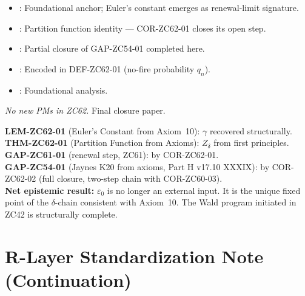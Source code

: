 \documentclass[12pt, a4paper]{article}
\begin{document}
\begin{inheritbox}[title={ZC62 Backward Inheritance}]
\begin{itemize}[leftmargin=1.5em]
\item {}: Foundational anchor; Euler's
  constant emerges as renewal-limit signature.
\item {}: Partition function
  identity --- COR-ZC62-01 closes its open step.
\item {}: Partial closure of
  GAP-ZC54-01 completed here.
\item {}: Encoded
  in DEF-ZC62-01 (no-fire probability $q_{n}$).
\item {}: Foundational analysis.
\end{itemize}
\end{inheritbox}

\begin{correctionbox}[title={ZC62 Forward Corrections / PMs}]
\textit{No new PMs in ZC62.} Final closure paper.
\end{correctionbox}

\begin{conmapbox}[title={ZC62 Closure Record --- Master Closures of v17.11}]
\textbf{LEM-ZC62-01} (Euler's Constant from Axiom~10):
\promotedstar{} $\gamma$ recovered structurally.\\[0.2em]
\textbf{THM-ZC62-01} (Partition Function from Axioms): \promotedstar{}
$Z_{\delta}$ from first principles.\\[0.2em]
\textbf{GAP-ZC61-01} (renewal step, ZC61): \closedcheck{} by
COR-ZC62-01.\\[0.2em]
\textbf{GAP-ZC54-01} (Jaynes K20 from axioms, Part H v17.10 XXXIX):
\closedcheck{} by COR-ZC62-02 (full closure, two-step chain with
COR-ZC60-03).\\[0.4em]
\textbf{Net epistemic result:} $\varepsilon_0$ is no longer an
external input. It is the unique fixed point of the $\delta$-chain
consistent with Axiom~10. The Wald program initiated in ZC42 is
structurally complete.
\end{conmapbox}

\section{R-Layer Standardization Note (Continuation)}
\label{sec:xlii-rlayer}
\end{document}
